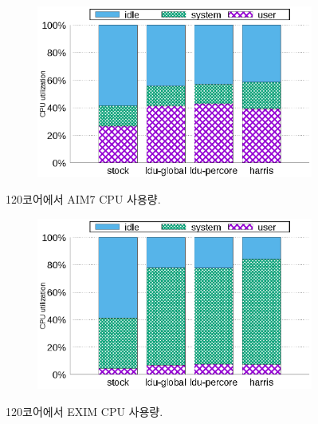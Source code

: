 \begin{figure}[tb]
    \centering
    \begin{subfigure}[b]{1\textwidth}
  \begin{center}
        \includegraphics[scale=0.8]{graph/aim7_cpuutils.eps}
  \end{center}
    \end{subfigure}%
    \centering
    \caption{120코어에서 AIM7 CPU 사용량.}
    \label{fig:utilization_aim7}
    
\end{figure}


\begin{figure}[tb]
    \centering
    \begin{subfigure}[b]{1\textwidth}
  \begin{center}
        \includegraphics[scale=0.8]{graph/exim_cpuutils.eps}
  \end{center}
    \end{subfigure}
    \centering
    \caption{120코어에서 EXIM CPU 사용량. }
    \label{fig:utilization_exim}
    
\end{figure}




